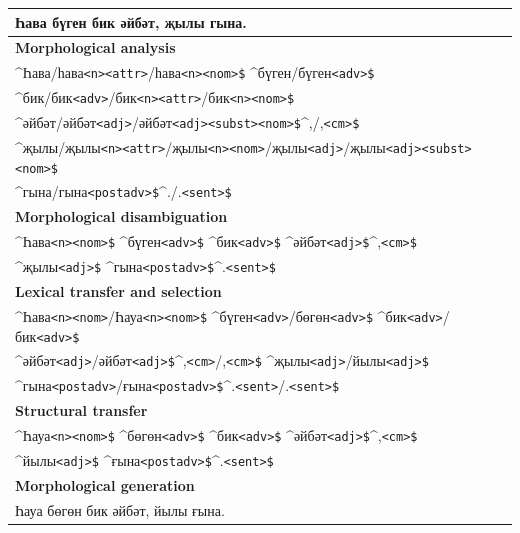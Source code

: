 \documentclass[10pt,xetex]{beamer} %
\newcommand{\atag}[1]{{\scriptsize{\texttt{#1}}}}
\begin{document}
\begin{frame}[fragile]

\fontsize{9pt}{11.2}\selectfont

\begin{tabular}{l}
\hline
\hline
 Һава бүген бик әйбәт, җылы гына. \\ 
\hline
{\bf Morphological analysis} \\
\hline
 \^{}Һава/һава\atag{<n>}\atag{<attr>}/һава\atag{<n>}\atag{<nom>\$} \^{}бүген/бүген\atag{<adv>\$}  \\
              \^{}бик/бик\atag{<adv>}/бик\atag{<n>}\atag{<attr>}/бик\atag{<n>}\atag{<nom>\$} \\ 
              \^{}әйбәт/әйбәт\atag{<adj>}/әйбәт\atag{<adj>}\atag{<subst>}\atag{<nom>\$}\^{},/,\atag{<cm>\$} \\ 
              \^{}җылы/җылы\atag{<n>}\atag{<attr>}/җылы\atag{<n>}\atag{<nom>}/җылы\atag{<adj>}/җылы\atag{<adj>}\atag{<subst>}\atag{<nom>\$} \\
              \^{}гына/гына\atag{<postadv>\$}\^{}./.\atag{<sent>\$} \\
\hline
{\bf Morphological disambiguation} \\
\hline
 \^{}Һава\atag{<n>}\atag{<nom>\$} \^{}бүген\atag{<adv>\$} \^{}бик\atag{<adv>\$} \^{}әйбәт\atag{<adj>\$}\^{},\atag{<cm>\$} \\ 
              \^{}җылы\atag{<adj>\$} \^{}гына\atag{<postadv>\$}\^{}.\atag{<sent>\$}\\
\hline
{\bf Lexical transfer and selection} \\
\hline
 \^{}Һава\atag{<n>}\atag{<nom>}/Һауа\atag{<n>}\atag{<nom>\$} \^{}бүген\atag{<adv>}/бөгөн\atag{<adv>\$} \^{}бик\atag{<adv>}/бик\atag{<adv>\$} \\
              \^{}әйбәт\atag{<adj>}/әйбәт\atag{<adj>\$}\^{},\atag{<cm>}/,\atag{<cm>\$} \^{}җылы\atag{<adj>}/йылы\atag{<adj>\$} \\ 
              \^{}гына\atag{<postadv>}/ғына\atag{<postadv>\$}\^{}.\atag{<sent>}/.\atag{<sent>\$}\\
\hline
{\bf Structural transfer} \\
\hline
 \^{}Һауа\atag{<n>}\atag{<nom>\$} \^{}бөгөн\atag{<adv>\$} \^{}бик\atag{<adv>\$} \^{}әйбәт\atag{<adj>\$}\^{},\atag{<cm>\$} \\ 
              \^{}йылы\atag{<adj>\$} \^{}ғына\atag{<postadv>\$}\^{}.\atag{<sent>\$}\\
\hline
{\bf Morphological generation} \\
\hline
 Һауа бөгөн бик әйбәт, йылы ғына. \\
\hline
\hline
\end{tabular}

\end{frame}
\end{document}
